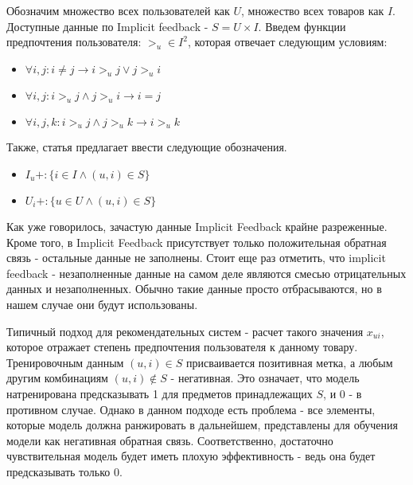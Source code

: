 \documentclass[14pt]{mmcs_article}
\begin{document}
Обозначим множество всех пользователей как $U$, множество всех товаров как $I$. Доступные данные по Implicit feedback -  $S = U \times I$. Введем функции предпочтения пользователя: $ >_u \in I^2$, которая отвечает следующим условиям:
\begin{itemize}
	\item $\forall i, j : i \neq j \rightarrow i >_u j \vee j >_u i$
	\item $\forall i, j : i >_u j \wedge j >_u i \rightarrow i = j$
	\item $\forall i, j, k :  i >_u j \wedge j >_u k  \rightarrow i >_u k $
\end{itemize}
Также, статья \cite{BPR:1205} предлагает ввести следующие обозначения. 
\begin{itemize}
	\item $I_u+: \{i \in I \wedge (u,i) \in S\}$
	\item $U_i+: \{u \in U \wedge (u,i) \in S\}$
\end{itemize}

Как уже говорилось, зачастую данные Implicit Feedback крайне разреженные. Кроме того, в Implicit Feedback присутствует только положительная обратная связь - остальные данные не заполнены. Стоит еще раз отметить, что implicit feedback - незаполненные данные на самом деле являются смесью отрицательных данных и незаполненных.
Обычно такие данные просто отбрасываются, но в нашем случае они будут использованы.

Типичный подход для рекомендательных систем - расчет такого значения $x_{ui}$, которое отражает степень предпочтения пользователя к данному товару. Тренировочным данным $(u,i) \in S$ присваивается позитивная метка, а любым другим комбинациям $(u,i) \notin S$ - негативная. Это означает, что модель натренирована предсказывать 1 для предметов принадлежащих $S$, и 0 - в противном случае. Однако в данном подходе есть проблема - все элементы, которые модель должна ранжировать в дальнейшем, представлены для обучения модели как негативная обратная связь. Соответственно, достаточно чувствительная модель будет иметь плохую эффективность - ведь она будет предсказывать только 0.    
\end{document}
